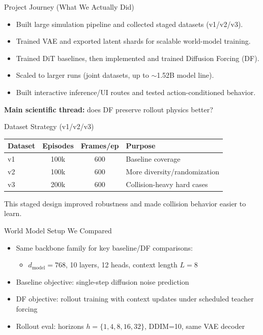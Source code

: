 \documentclass[aspectratio=169,11pt]{beamer}
\begin{document}
\begin{frame}{Project Journey (What We Actually Did)}
\begin{itemize}
  \item Built large simulation pipeline and collected staged datasets (v1/v2/v3).
  \item Trained VAE and exported latent shards for scalable world-model training.
  \item Trained DiT baselines, then implemented and trained Diffusion Forcing (DF).
  \item Scaled to larger runs (joint datasets, up to \(\sim\)1.52B model line).
  \item Built interactive inference/UI routes and tested action-conditioned behavior.
\end{itemize}
\vspace{0.4em}
\textbf{Main scientific thread:} does DF preserve rollout physics better?
\end{frame}

\begin{frame}{Dataset Strategy (v1/v2/v3)}
\begin{table}
\centering
\begin{tabular}{lccp{4.2cm}}
\toprule
Dataset & Episodes & Frames/ep & Purpose \\
\midrule
v1 & 100k & 600 & Baseline coverage \\
v2 & 100k & 600 & More diversity/randomization \\
v3 & 200k & 600 & Collision-heavy hard cases \\
\bottomrule
\end{tabular}
\end{table}
\vspace{0.2em}
This staged design improved robustness and made collision behavior easier to learn.
\end{frame}

\begin{frame}{World Model Setup We Compared}
\begin{itemize}
  \item Same backbone family for key baseline/DF comparisons:
  \begin{itemize}
    \item \(d_{\text{model}}=768\), 10 layers, 12 heads, context length \(L=8\)
  \end{itemize}
  \item Baseline objective: single-step diffusion noise prediction
  \item DF objective: rollout training with context updates under scheduled teacher forcing
  \item Rollout eval: horizons \(h=\{1,4,8,16,32\}\), DDIM=10, same VAE decoder
\end{itemize}
\end{frame}
\end{document}
